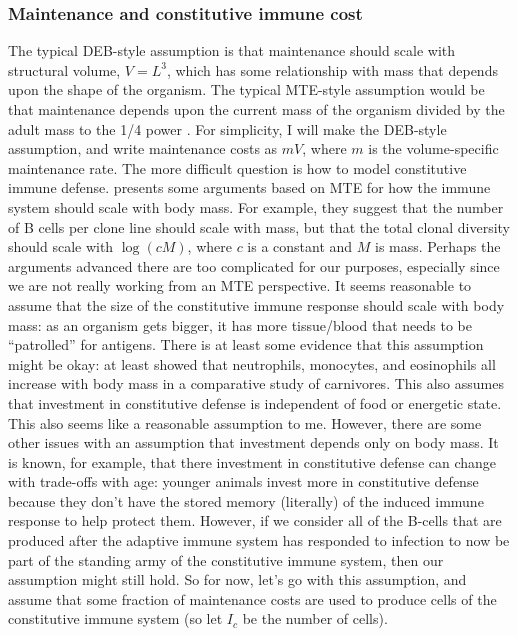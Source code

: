 \documentclass[11pt,reqno,final,pdftex]{amsart}\usepackage[]{graphicx}\usepackage[]{color}
\theoremstyle{plain}
\numberwithin{equation}{part}
\begin{document}
\subsubsection*{Maintenance and constitutive immune cost}
The typical DEB-style assumption is that maintenance should scale with structural volume, $V=L^3$, which has some relationship with mass that depends upon the shape of the organism.
The typical MTE-style assumption would be that maintenance depends upon the current mass of the organism divided by the adult mass to the 1/4 power \citep[so that, for adults, maintenance scales with mass to the 3/4 power,]{Hou2008}.
For simplicity, I will make the DEB-style assumption, and write maintenance costs as $m V$, where $m$ is the volume-specific maintenance rate.
The more difficult question is how to model constitutive immune defense.
\citet{Wiegel2004} presents some arguments based on MTE for how the immune system should scale with body mass.
For example, they suggest that the number of B cells per clone line should scale with mass, but that the total clonal diversity should scale with $\log(cM)$, where $c$ is a constant and $M$ is mass.
Perhaps the arguments advanced there are too complicated for our purposes, especially since we are not really working from an MTE perspective.
It seems reasonable to assume that the size of the constitutive immune response should scale with body mass: as an organism gets bigger, it has more tissue/blood that needs to be ``patrolled'' for antigens.
There is at least some evidence that this assumption might be okay: \citet{Nunn2003} at least showed that neutrophils, monocytes, and eosinophils all increase with body mass in a comparative study of carnivores.
This also assumes that investment in constitutive defense is independent of food or energetic state.
This also seems like a reasonable assumption to me.
However, there are some other issues with an assumption that investment depends only on body mass.
It is known, for example, that there investment in constitutive defense can change with
trade-offs with age: younger animals invest more in constitutive defense because they don't have the stored memory (literally) of the induced immune response to help protect them.
However, if we consider all of the B-cells that are produced after the adaptive immune system has responded to infection to now be part of the standing army of the constitutive immune system, then our assumption might still hold.
So for now, let's go with this assumption, and assume that some fraction of maintenance costs are used to produce cells of the constitutive immune system (so let $I_c$ be the number of cells).
\end{document}
